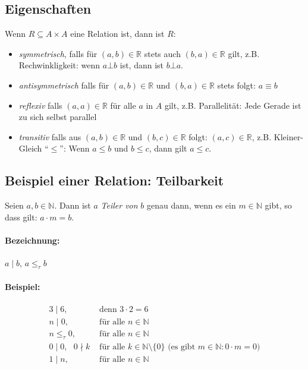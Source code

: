 
\subsection{Eigenschaften}

Wenn $R \subseteq A \times A$ eine Relation ist, dann ist $R$:
\begin{itemize}
\item \emph{symmetrisch}, falls für $(a, b) \in \mathbb{R}$ stets auch
  $(b, a) \in \mathbb{R}$ gilt, z.B. Rechwinkligkeit: wenn $a \bot b$ ist,
  dann ist $b \bot a$.
 \item \emph{antisymmetrisch} falls für $(a, b) \in \mathbb{R}$ und $(b, a) \in \mathbb{R}$  stets folgt: $a \equiv b$
 \item \emph{reflexiv} falls $(a, a) \in \mathbb{R}$ für alle $a$ in
   $A$ gilt, z.B. Parallelität: Jede Gerade ist zu sich selbst parallel
 \item \emph{transitiv} falls aus $(a, b) \in \mathbb{R}$ und $(b, c)
   \in \mathbb{R}$ folgt: $(a, c) \in \mathbb{R}$, z.B. Kleiner-Gleich
   ``$\leq$'': Wenn $a \leq b$ und $b \leq c$, dann gilt $a \leq c$.
\end{itemize}

\subsection{Beispiel einer Relation: Teilbarkeit}

Seien $a, b \in \mathbb{N}$. Dann ist $a$ \emph{Teiler von} $b$ genau dann, wenn
es ein $m \in \mathbb{N}$ gibt, so dass gilt: $a \cdot m = b$.

\paragraph{Bezeichnung:} $a \mid b$, $a \le_\tau b$

\paragraph{Beispiel:}
\begin{align*}
3 \mid 6,                    & \text{ denn }     3 \cdot 2 = 6    \\
n \mid 0,                    & \text{ für alle } n \in \mathbb{N} \\
n \le_\tau 0,                 & \text{ für alle } n \in \mathbb{N} \\
0 \mid 0, \text{ } 0 \nmid k & \text{ für alle } k \in \mathbb{N} \setminus \{0\} \text{ (es gibt }  m \in \mathbb{N}: 0 \cdot m = 0 \text{)} \\
1 \mid n,                    & \text{ für alle } n \in \mathbb{N} \\
\end{align*}

